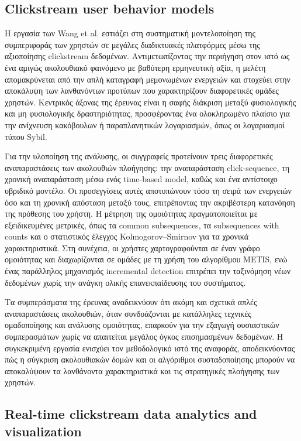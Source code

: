 \documentclass[12pt,a4paper]{article}
\begin{document}
	\subsection{Clickstream user behavior models}
	
	Η εργασία των Wang et al. \cite{ClickstreamUserBehaviorModels} εστιάζει στη συστηματική μοντελοποίηση της συμπεριφοράς των χρηστών σε μεγάλες διαδικτυακές πλατφόρμες μέσω της αξιοποίησης clickstream δεδομένων. Αντιμετωπίζοντας την περιήγηση στον ιστό ως ένα αμιγώς ακολουθιακό φαινόμενο με βαθύτερη ερμηνευτική αξία, η μελέτη απομακρύνεται από την απλή καταγραφή μεμονωμένων ενεργειών και στοχεύει στην αποκάλυψη των λανθανόντων προτύπων που χαρακτηρίζουν διαφορετικές ομάδες χρηστών. Κεντρικός άξονας της έρευνας είναι η σαφής διάκριση μεταξύ φυσιολογικής και μη φυσιολογικής δραστηριότητας, προσφέροντας ένα ολοκληρωμένο πλαίσιο για την ανίχνευση κακόβουλων ή παραπλανητικών λογαριασμών, όπως οι λογαριασμοί τύπου Sybil.  
	
	Για την υλοποίηση της ανάλυσης, οι συγγραφείς προτείνουν τρεις διαφορετικές αναπαραστάσεις των ακολουθιών πλοήγησης: την αναπαράσταση click-sequence, τη χρονική αναπαράσταση μέσω ενός time-based model, καθώς και ένα αντίστοιχο υβριδικό μοντέλο. Οι προσεγγίσεις αυτές αποτυπώνουν τόσο τη σειρά των ενεργειών όσο και τη χρονική απόσταση μεταξύ τους, επιτρέποντας την ακριβέστερη κατανόηση της πρόθεσης του χρήστη. Η μέτρηση της ομοιότητας πραγματοποιείται με εξειδικευμένες μετρικές, όπως τα common subsequences, τα subsequences with counts και ο στατιστικός έλεγχος Kolmogorov--Smirnov για τα χρονικά χαρακτηριστικά. Στη συνέχεια, οι χρήστες χαρτογραφούνται σε έναν γράφο ομοιότητας και διαχωρίζονται σε ομάδες με τη χρήση του αλγορίθμου METIS, ενώ ένας παράλληλος μηχανισμός incremental detection επιτρέπει την ταξινόμηση νέων δεδομένων χωρίς την ανάγκη ολικής επανεκπαίδευσης του συστήματος.  
	
	Τα συμπεράσματα της έρευνας αναδεικνύουν ότι ακόμη και σχετικά απλές αναπαραστάσεις ακολουθιών, όταν συνδυάζονται με κατάλληλες τεχνικές ομαδοποίησης και ανάλυσης ομοιότητας, επαρκούν για την εξαγωγή ουσιαστικών συμπερασμάτων χωρίς να απαιτείται μεγάλος όγκος επισημασμένων δεδομένων. Η συγκεκριμένη εργασία ενισχύει τον μεθοδολογικό ιστό της αναφοράς, αποδεικνύοντας πώς η σύγκριση ακολουθιακών δομών και οι αλγόριθμοι συσταδοποίησης μπορούν να αποκαλύψουν τα λανθάνοντα χαρακτηριστικά και τις στρατηγικές πλοήγησης των χρηστών.
	
	\subsection{Real-time clickstream data analytics and visualization}
	
\end{document}
